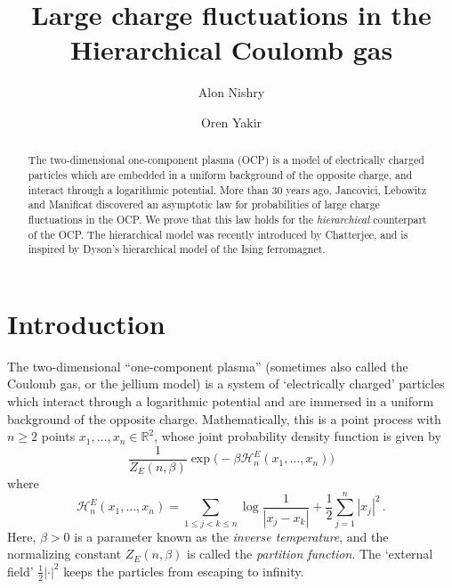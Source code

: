 \documentclass[11pt]{amsart}
\theoremstyle{definition}
\theoremstyle{remark}
\numberwithin{equation}{section}
\newcommand{\bR}{\mathbb R}
\begin{document}
	
	
	\title[Large fluctuations of the Hierarchical Coulomb gas]{Large charge fluctuations in the Hierarchical Coulomb gas}
	
	\author{Alon Nishry}
	\address{\tiny{Alon Nishry, School of Mathematical Sciences, Tel Aviv University}}
	
	\author{Oren Yakir}
	\address{\tiny{Oren Yakir, School of Mathematical Sciences, Tel Aviv University}}
	
	\begin{abstract}
		The two-dimensional one-component plasma (OCP) is a model of electrically charged particles which are embedded in a uniform background of the opposite charge, and interact through a logarithmic potential. More than 30 years ago, Jancovici, Lebowitz and Manificat discovered an asymptotic law for probabilities of large charge fluctuations in the OCP. We prove that this law holds for the \emph{hierarchical} counterpart of the OCP. The hierarchical model was recently introduced  by Chatterjee, and is inspired by Dyson’s hierarchical model of the Ising ferromagnet.
	\end{abstract}
	\maketitle 
	\thispagestyle{empty}
	\section{Introduction}
	The two-dimensional ``one-component plasma'' (sometimes also called the Coulomb gas, or the jellium model) is a system of `electrically charged' particles which interact through a logarithmic potential and are immersed in a uniform background of the opposite charge. Mathematically, this is a point process with $n\ge 2$ points $x_1,\ldots,x_n\in \bR^2$, whose joint probability density function is given by
	\begin{equation}
		\label{eq:density_for_euclidean_coulomb}
		\frac{1}{Z_E(n,\beta)} \exp\Big(-\beta\mathcal{H}_n^E(x_1,\ldots,x_n)\Big)
	\end{equation}
	where
	\begin{equation*}
		\mathcal{H}_n^E(x_1,\ldots,x_n) = \sum_{1\le j<k\le n} \log\frac{1}{|x_j-x_k|} + \frac{1}{2}\sum_{j=1}^{n} |x_j|^2 \, .
	\end{equation*}
	Here, $\beta>0$ is a parameter known as the \emph{inverse temperature}, and the normalizing constant $Z_E(n,\beta)$ is called the \emph{partition function}. The `external field' $\frac{1}{2}|\cdot|^2$ keeps the particles from escaping to infinity.
	
\end{document}
